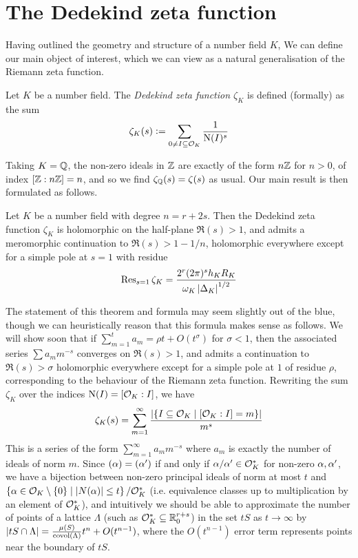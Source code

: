 \documentclass[11pt]{report}
\begin{document}
\section{The Dedekind zeta function}
Having outlined the geometry and structure of a number field $K$, We can define our main object of interest, which we can view as a natural generalisation of the Riemann zeta function.
\begin{definition}
    Let $K$ be a number field. The \emph{Dedekind zeta function $\zeta_K$} is defined (formally) as the sum
    $$
        \zeta_K(s) \vcentcolon= \sum_{0 \neq I \subseteq \mathcal{O}_K} \frac1{\operatorname{N}(I)^s}
    $$
\end{definition}
Taking $K = \mathbb{Q}$, the non-zero ideals in $\mathbb{Z}$ are exactly of the form $n\mathbb{Z}$ for $n > 0$, of index $[\mathbb{Z} : n\mathbb{Z}] = n$, and so we find $\zeta_{\mathbb{Q}}(s) = \zeta(s)$ as usual. Our main result is then formulated as follows.
\begin{theorem}\label{acnf1}
    Let $K$ be a number field with degree $n = r + 2s$. Then the Dedekind zeta function $\zeta_K$ is holomorphic on the half-plane $\Re(s) > 1$, and admits a meromorphic continuation to $\Re(s) > 1 - 1/n$, holomorphic everywhere except for a simple pole at $s = 1$ with residue
    $$
        \operatorname{Res}_{s = 1}\zeta_K = \frac{2^r(2\pi)^sh_KR_K}{\omega_K\left| \Delta_K \right|^{1/2}}
    $$
\end{theorem}
The statement of this theorem and formula may seem slightly out of the blue, though we can heuristically reason that this formula makes sense as follows. We will show soon that if $\sum_{m = 1}^t a_m = \rho t + O(t^\sigma)$ for $\sigma < 1$, then the associated series $\sum a_mm^{-s}$ converges on $\Re(s) > 1$, and admits a continuation to $\Re(s) > \sigma$ holomorphic everywhere except for a simple pole at $1$ of residue $\rho$, corresponding to the behaviour of the Riemann zeta function. Rewriting the sum $\zeta_K$ over the indices $\operatorname{N}(I) = [\mathcal{O}_K : I]$, we have
\begin{align}\label{coeffs}
    \zeta_K(s) = \sum_{m = 1}^\infty \frac{\left| \left\{  I \subseteq \mathcal{O}_K \mid [\mathcal{O}_K : I] = m  \right\} \right|}{m^s}
\end{align}
This is a series of the form $\sum_{m = 1}^\infty a_mm^{-s}$ where $a_m$ is exactly the number of ideals of norm $m$. Since $(\alpha) = (\alpha')$ if and only if $\alpha/\alpha' \in \mathcal{O}_K^*$ for non-zero $\alpha, \alpha'$, we have a bijection between non-zero principal ideals of norm at most $t$ and $\left\{  \alpha \in \mathcal{O}_K \setminus \left\{  0  \right\} \mid \left| N(\alpha) \right| \leq t  \right\} / \mathcal{O}_K^*$ (i.e. equivalence classes up to multiplication by an element of $\mathcal{O}_K^*$), and intuitively we should be able to approximate the number of points of a lattice $\Lambda$ (such as $\mathcal{O}_K^* \subseteq \mathbb{R}_0^{r + s}$) in the set $tS$ as $t \to \infty$ by $\left| tS \cap \Lambda \right| = \frac{\mu(S)}{\operatorname{covol}(\Lambda)}t^n + O(t^{n - 1})$, where the $O(t^{n - 1})$ error term represents points near the boundary of $tS$. 
\end{document}
